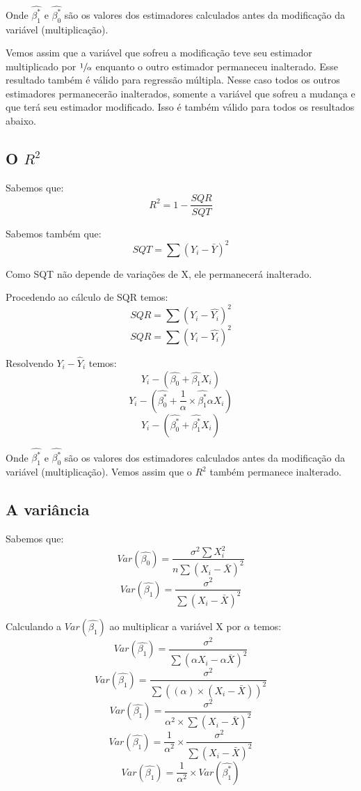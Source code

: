 \documentclass[12pt,a4paper,titlepage=false]{scrartcl}
\begin{document}
Onde \(\hat{\beta_{1}^{\ast}}\) e \(\hat{\beta_{0}^{\ast}}\) são os valores dos estimadores calculados antes da modificação da variável (multiplicação).

Vemos assim que a variável que sofreu a modificação teve seu estimador multiplicado por \(\sfrac{1}{\alpha}\) enquanto o outro estimador permaneceu inalterado. Esse resultado também é válido para regressão múltipla. Nesse caso todos os outros estimadores permanecerão inalterados, somente a variável que sofreu a mudança e que terá seu estimador modificado. Isso é também válido para todos os resultados abaixo.

\subsection{O \(R^{2}\)}
Sabemos que:
\[R^{2} = 1 - \frac{SQR}{SQT}\]

Sabemos também que:
\[SQT = \sum{(Y_{i} - \bar{Y})^{2}}\]

Como SQT não depende de variações de X, ele permanecerá inalterado.

Procedendo ao cálculo de SQR temos:
\[SQR = \sum{(Y_{i} - \hat{Y_{i}})^{2}}\]
\[SQR = \sum{(Y_{i} - \hat{Y_{i}})^{2}}\]

Resolvendo \(Y_{i} - \hat{Y}_{i}\) temos:
\[Y_{i} - (\hat{\beta_{0}} + \hat{\beta_{1}}X_{i})\]
\[Y_{i} - (\hat{\beta_{0}^{\ast}} + \frac{1}{\alpha} \times \hat{\beta_{1}^{\ast}}\alpha X_{i})\]
\[Y_{i} - (\hat{\beta_{0}^{\ast}} + \hat{\beta_{1}^{\ast}}X_{i})\]

Onde \(\hat{\beta_{1}^{\ast}}\) e \(\hat{\beta_{0}^{\ast}}\) são os valores dos estimadores calculados antes da modificação da variável (multiplicação). Vemos assim que o \(R^{2}\) também permanece inalterado.

\subsection{A variância}
Sabemos que:
\[Var(\hat{\beta_{0}}) = \frac{\sigma^{2}\sum{X_{i}^{2}}}{n\sum{(X_{i} - \bar{X})^{2}}}\]
\[Var(\hat{\beta_{1}}) = \frac{\sigma^{2}}{\sum{(X_{i} - \bar{X})^{2}}}\]

Calculando a \(Var(\hat{\beta_{1}})\) ao multiplicar a variável X por \(\alpha\) temos:
\[Var(\hat{\beta_{1}}) = \frac{\sigma^{2}}{\sum{(\alpha X_{i} - \alpha\bar{X})^{2}}}\]
\[Var(\hat{\beta_{1}}) = \frac{\sigma^{2}}{\sum{((\alpha) \times (X_{i} - \bar{X}))^{2}}}\]
\[Var(\hat{\beta_{1}}) = \frac{\sigma^{2}}{\alpha^{2} \times \sum{(X_{i} - \bar{X})^{2}}}\]
\[Var(\hat{\beta_{1}}) = \frac{1}{\alpha^{2}} \times \frac{\sigma^{2}}{\sum{(X_{i} - \bar{X})^{2}}}\]
\[Var(\hat{\beta_{1}}) = \frac{1}{\alpha^{2}} \times Var(\hat{\beta_{1}^{\ast}})\]
\end{document}
